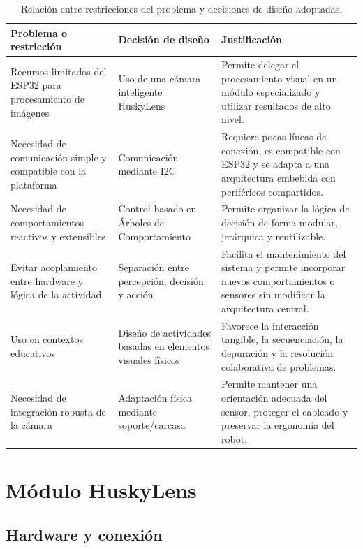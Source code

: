 \documentclass{prgrado}
\begin{document}
\begin{table}
\centering
\begin{tabular}{|p{4.2cm}|p{4.2cm}|p{5.2cm}|}
\hline
\textbf{Problema o restricción} & \textbf{Decisión de diseño} & \textbf{Justificación} \\
\hline
Recursos limitados del ESP32 para procesamiento de imágenes &
Uso de una cámara inteligente HuskyLens &
Permite delegar el procesamiento visual en un módulo especializado y utilizar resultados de alto nivel. \\
\hline
Necesidad de comunicación simple y compatible con la plataforma &
Comunicación mediante I2C &
Requiere pocas líneas de conexión, es compatible con ESP32 y se adapta a una arquitectura embebida con periféricos compartidos. \\
\hline
Necesidad de comportamientos reactivos y extensibles &
Control basado en Árboles de Comportamiento &
Permite organizar la lógica de decisión de forma modular, jerárquica y reutilizable. \\
\hline
Evitar acoplamiento entre hardware y lógica de la actividad &
Separación entre percepción, decisión y acción &
Facilita el mantenimiento del sistema y permite incorporar nuevos comportamientos o sensores sin modificar la arquitectura central. \\
\hline
Uso en contextos educativos &
Diseño de actividades basadas en elementos visuales físicos &
Favorece la interacción tangible, la secuenciación, la depuración y la resolución colaborativa de problemas. \\
\hline
Necesidad de integración robusta de la cámara &
Adaptación física mediante soporte/carcasa &
Permite mantener una orientación adecuada del sensor, proteger el cableado y preservar la ergonomía del robot. \\
\hline
\end{tabular}
\caption{Relación entre restricciones del problema y decisiones de diseño adoptadas.}
\label{tab:justificacion-diseno}
\end{table}



\chapter{Módulo HuskyLens}

\section{Hardware y conexión}
\end{document}

